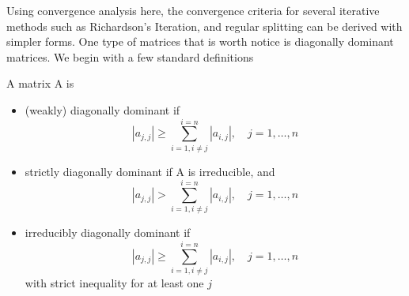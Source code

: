 Using convergence analysis here, the convergence criteria for several iterative methods such as Richardson's Iteration, and regular splitting can be derived with simpler forms. One type of matrices that is worth notice is diagonally dominant matrices. We begin with a few standard definitions
\begin{definition}
    A matrix A is 
    \begin{itemize}
        \item (weakly) diagonally dominant if \begin{equation}
            |a_{j,j}| \geq \sum_{i=1,i\neq j}^{i=n}|a_{i,j}|,\quad j = 1,\dots,n
        \end{equation}
        \item strictly diagonally dominant if A is irreducible, and \begin{equation}
             |a_{j,j}| > \sum_{i=1,i\neq j}^{i=n}|a_{i,j}|,\quad j = 1,\dots,n
        \end{equation}
        \item irreducibly diagonally dominant if \begin{equation}
             |a_{j,j}| \geq \sum_{i=1,i\neq j}^{i=n}|a_{i,j}|,\quad j = 1,\dots,n
        \end{equation} 
        with strict inequality for at least one $j$
    \end{itemize}
\end{definition}

